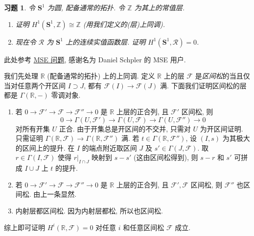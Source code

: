 \documentclass{article}
\theoremstyle{exercise}
\newtheorem{exercise}{习题}[section]
\theoremstyle{plain}
\theoremstyle{remark}
\newenvironment{proofc}{\proof}{\endproof}
\def\Z{\mathbb{Z}}
\def\R{\mathbb{R}}
\def\bS{\mathbf{S}}
\def\cF{\mathscr{F}}
\def\cR{\mathscr{R}}
\begin{document}
\begin{exercise}
  令 $\bS^1$ 为圆, 配备通常的拓扑. 令 $\Z$ 为其上的常值层.
  \begin{enumerate}[label=(\arabic*)]
    \item 证明 $H^1(\bS^1, \Z) \cong \Z$ (用我们定义的(层)上同调).
    \item 现在令 $\cR$ 为 $\bS^1$ 上的连续实值函数层. 证明 $H^1(\bS^1, \cR) = 0$.
  \end{enumerate}
\end{exercise}

\begin{proofc}
  此处参考 \href{https://math.stackexchange.com/questions/2801221/why-does-the-sheaf-cohomology-of-the-constant-sheaf-on-mathbbr-vanish}{MSE 问题},
  感谢名为 Daniel Schpler 的 MSE 用户.

  我们先处理 $\R$ (配备通常的拓扑) 上的上同调.
  定义 $\R$ 上的层 $\cF$ 是\emph{区间松}的当且仅当对任意两个开区间 $I \supset J$, 都有 $\cF(I) \to \cF(J)$ 满.
  下面我们证明区间松的层都是 $\Gamma(\R, -)$ 零调对象.
  \begin{enumerate}
    \item 若 $0 \to \cF' \to \cF \to \cF'' \to 0$ 是 $\R$ 上层的正合列, 且 $\cF'$ 区间松, 则
          \[
          0 \to \Gamma(U, \cF') \to \Gamma(U, \cF) \to \Gamma(U, \cF'') \to 0
          \]
          对所有开集 $U$ 正合. 由于开集总是开区间的不交并, 只需对 $U$ 为开区间证明.
          只需证明 $\Gamma(\R, \cF) \to \Gamma(\R, \cF'')$ 满.
          若 $t \in \Gamma(\R, \cF'')$, 设 $(I, s)$ 为其极大的区间上的提升.
          在 $I$ 的端点附近取区间 $J$ 及 $s' \in \Gamma(J, \cF)$.
          取 $r \in \Gamma(I, \cF)$ 使得 $r|_{I \cap J}$ 映射到 $s - s'$ (这由区间松得到),
          则 $s - r$ 和 $s'$ 可拼成 $I \cup J$ 上 $t$ 的提升.
    \item 若 $0 \to \cF' \to \cF \to \cF'' \to 0$ 是 $\R$ 上层的正合列, 且 $\cF', \cF$ 区间松,
          则 $\cF''$ 也区间松. 由上一条显然.
    \item 内射层都区间松. 因为内射层都松, 所以也区间松.
  \end{enumerate}
  综上即可证明 $H^i(\R, \cF) = 0$ 对任意 $i$ 和任意区间松 $\cF$ 成立.


\end{proofc}
\end{document}
